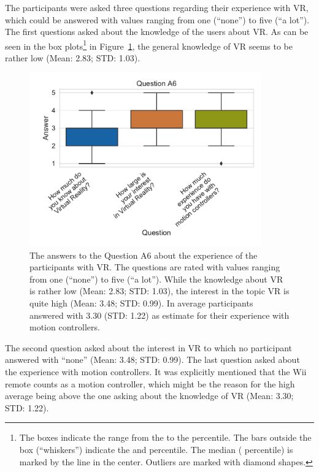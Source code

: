 The participants were asked three questions regarding their experience with \gls{VR}, which could be answered with values ranging from one (\enquote{none}) to five (\enquote{a lot}). The first questions asked about the knowledge of the users about \gls{VR}. As can be seen in the box plots\footnote{The boxes indicate the range from the  to the  percentile. The bars outside the box (\enquote{whiskers}) indicate the  and  percentile. The median ( percentile) is marked by the line in the center. Outliers are marked with diamond shapes.} in Figure~\ref{fig:res-demo-q9}, the general knowledge of \gls{VR} seems to be rather low (Mean: 2.83; \gls{STD}: 1.03).

\begin{figure}[H]
	\centering
	\includegraphics[width=10cm]{figures/evaluation/res_demo_q9.pdf}
	\caption[VR experience of the participants]{The answers to the Question A6 about the experience of the participants with \gls{VR}. The questions are rated with values ranging from one (\enquote{none}) to five (\enquote{a lot}). While the knowledge about \gls{VR} is rather low (Mean: 2.83; \gls{STD}: 1.03), the interest in the topic \gls{VR} is quite high (Mean: 3.48; \gls{STD}: 0.99). In average participants answered with 3.30 (\gls{STD}: 1.22) as estimate for their experience with motion controllers.}\label{fig:res-demo-q9}
\end{figure}

The second question asked about the interest in \gls{VR} to which no participant answered with \enquote{none} (Mean: 3.48; \gls{STD}: 0.99). The last question asked about the experience with motion controllers. It was explicitly mentioned that the Wii remote counts as a motion controller, which might be the reason for the high average being above the one asking about the knowledge of \gls{VR} (Mean: 3.30; \gls{STD}: 1.22).


